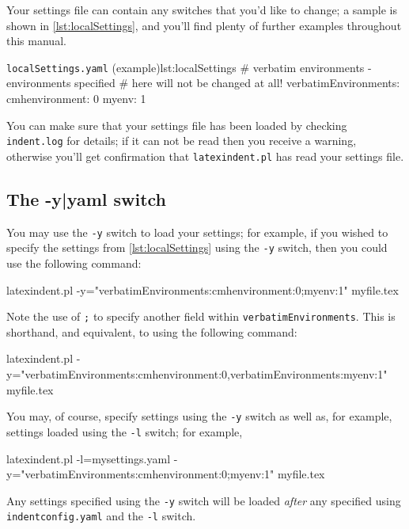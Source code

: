 	Your settings file can contain any switches that you'd like to change; a sample is shown
	in \cref{lst:localSettings}, and you'll find plenty of further examples throughout this
	manual. 

	\begin{yaml}{\texttt{localSettings.yaml} (example)}{lst:localSettings}
#  verbatim environments - environments specified
#  here will not be changed at all!
verbatimEnvironments:
    cmhenvironment: 0
    myenv: 1
\end{yaml}

	You can make sure that your settings file has been loaded by checking \texttt{indent.log}
	for details; if it can not be read then you receive a warning, otherwise you'll get
	confirmation that \texttt{latexindent.pl} has read your settings file.

\subsection{The -y|yaml switch}\label{sec:yamlswitch}
	You%
	may use the \texttt{-y} switch to load your settings;  for example, if you wished to
	specify the settings from \cref{lst:localSettings} using the \texttt{-y} switch, then you
	could use the following command:
	\begin{commandshell}
latexindent.pl -y="verbatimEnvironments:cmhenvironment:0;myenv:1" myfile.tex
\end{commandshell}
	Note the use of \texttt{;} to specify another field within \texttt{verbatimEnvironments}.
	This is shorthand, and equivalent, to using the following command: 
	\begin{commandshell}
latexindent.pl -y="verbatimEnvironments:cmhenvironment:0,verbatimEnvironments:myenv:1" myfile.tex
\end{commandshell}
	You may, of course, specify settings using the \texttt{-y} switch as well as, for
	example, settings loaded using the \texttt{-l} switch; for example,  
	\begin{commandshell}
latexindent.pl -l=mysettings.yaml -y="verbatimEnvironments:cmhenvironment:0;myenv:1" myfile.tex
\end{commandshell}
	Any settings specified using the \texttt{-y} switch will be loaded \emph{after} any
	specified using \texttt{indentconfig.yaml} and the \texttt{-l} switch.

